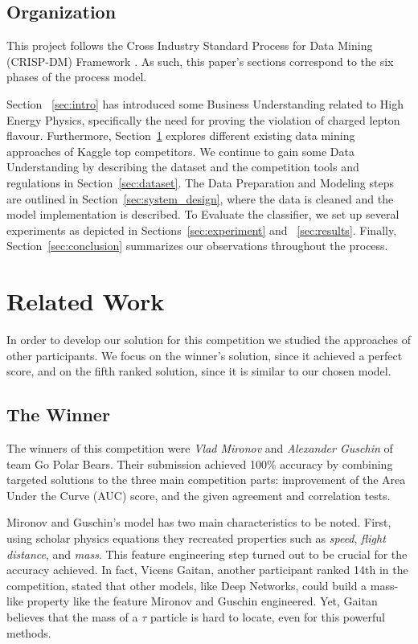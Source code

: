 \documentclass[conference]{IEEEtran}
\begin{document}
\subsection{Organization}
This project follows the Cross Industry Standard Process for Data Mining (CRISP-DM) Framework \cite{shearer2000crisp}. As such, this paper's sections correspond to the six phases of the process model.

Section ~\ref{sec:intro} has introduced some Business Understanding related to High Energy Physics, specifically the need for proving the violation of charged lepton flavour. Furthermore, Section~\ref{sec:related_work} explores different existing data mining approaches of Kaggle top competitors. We continue to gain some Data Understanding by describing the dataset and the competition tools and regulations in Section~\ref{sec:dataset}. The Data Preparation and Modeling steps are outlined in Section~\ref{sec:system_design}, where the data is cleaned and the model implementation is described. To Evaluate the classifier, we set up several experiments as depicted in Sections~\ref{sec:experiment} and ~\ref{sec:results}. Finally, Section~\ref{sec:conclusion} summarizes our observations throughout the process.

\section{Related Work}
\label{sec:related_work}
In order to develop our solution for this competition we studied the approaches of other participants. We focus on the winner's solution, since it achieved a perfect score, and on the fifth ranked solution, since it is similar to our chosen model.

\subsection{The Winner}
The winners of this competition were \textit{Vlad Mironov} and \textit{Alexander Guschin} of team Go Polar Bears. Their submission achieved 100\% accuracy by combining targeted solutions to the three main competition parts: improvement of the Area Under the Curve (AUC) score, and the given agreement and correlation tests.

Mironov and Guschin's model has two main characteristics to be noted. First, using scholar physics equations they recreated properties such as \textit{speed}, \textit{flight distance}, and \textit{mass}. This feature engineering step turned out to be crucial for the accuracy achieved. In fact, Vicens Gaitan, another participant ranked 14th in the competition, stated that other models, like Deep Networks, could build a mass-like property like the feature Mironov and Guschin engineered. Yet, Gaitan believes that the mass of a $\tau$ particle is hard to locate, even for this powerful methods.
\end{document}
